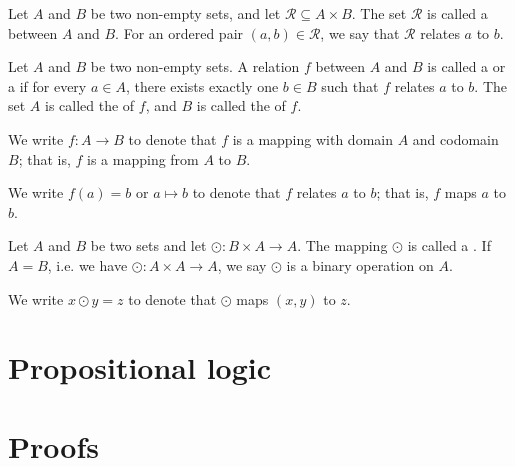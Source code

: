\begin{defn}
Let $ A $ and $ B $ be two non-empty sets, and let $ \mathcal{R}\subseteq A\times B $. The set $ \mathcal{R} $ is called a  between $ A $ and $ B $. For an ordered pair $ (a,b)\in\mathcal{R} $, we say that $ \mathcal{R} $ relates $ a $ to $ b $.
\end{defn}

\begin{defn}
Let $ A $ and $ B $ be two non-empty sets. A relation $ f $ between $ A $ and $ B $ is called a  or a  if for every $ a\in A $, there exists exactly one $ b\in B $ such that $ f $ relates $ a $ to $ b $. The set $ A $ is called the  of $ f $, and $ B $ is called the  of $ f $.

We write $ f:A\to B $ to denote that $ f $ is a mapping with domain $ A $ and codomain $ B $; that is, $ f $ is a mapping from $ A $ to $ B $.

We write $ f(a)=b $ or $ a\mapsto b $ to denote that $ f $ relates $ a $ to $ b $; that is, $ f $ maps $ a $ to $ b $.
\end{defn}

\begin{defn}\label{defn:binop}
Let $ A $ and $ B $ be two sets and let $ \odot:B\times A\to A $. The mapping $ \odot $ is called a . If $ A=B $, i.e. we have $ \odot:A\times A\to A $, we say $ \odot $ is a binary operation on $ A $.

We write $ x\odot y=z $ to denote that $ \odot $ maps $ (x,y) $ to $ z $.
\end{defn}

\section{Propositional logic}

\section{Proofs}
